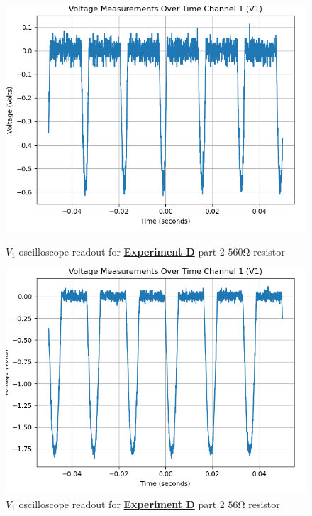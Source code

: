 \documentclass[
	letterpaper
	12pt
]{template}
\newcommand{\bref}[2]{\textbf{\hyperref[#1]{#2}}}
\begin{document}
\begin{figure}[H]\label{data::D5}
	\centering
	\begin{minipage}[c]{0.45\textwidth}
		\centering
		\includegraphics[width=\textwidth]{figures/D/5--ch1.png}
	    \caption{$V_{1}$ oscilloscope readout for \bref{exp::D}{Experiment D} part 2 $560\unit{\ohm}$ resistor}
	\end{minipage}
	\hfill
	\begin{minipage}[c]{0.45\textwidth}
		\centering
		\includegraphics[width=\textwidth]{figures/D/6--ch1.png}
	    \caption{$V_{1}$ oscilloscope readout for \bref{exp::D}{Experiment D} part 2 $56\unit{\ohm}$ resistor}
	\end{minipage}
\end{figure}
\end{document}
